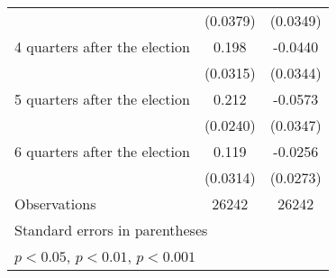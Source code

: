 \begin{table}[htbp]
\begin{tabular}{l*{2}{c}}
                    &    (0.0379)         &    (0.0349)         \\
[1em]
 4 quarters after the election&       0.198\sym{***}&     -0.0440         \\
                    &    (0.0315)         &    (0.0344)         \\
[1em]
 5 quarters after the election&       0.212\sym{***}&     -0.0573         \\
                    &    (0.0240)         &    (0.0347)         \\
[1em]
 6 quarters after the election&       0.119\sym{***}&     -0.0256         \\
                    &    (0.0314)         &    (0.0273)         \\
\hline
Observations        &       26242         &       26242         \\
\hline\hline
\multicolumn{3}{l}{\footnotesize Standard errors in parentheses}\\
\multicolumn{3}{l}{\footnotesize \sym{*} \(p<0.05\), \sym{**} \(p<0.01\), \sym{***} \(p<0.001\)}\\
\end{tabular}
\end{table}
